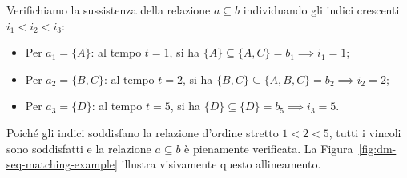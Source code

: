 Verifichiamo la sussistenza della relazione $a \subseteq b$ individuando gli indici crescenti $i_1 < i_2 < i_3$:
\begin{itemize}
    \item Per $a_1 = \{A\}$: al tempo $t = 1$, si ha $\{A\} \subseteq \{A, C\} = b_1 \implies i_1 = 1$;
    \item Per $a_2 = \{B, C\}$: al tempo $t = 2$, si ha $\{B, C\} \subseteq \{A, B, C\} = b_2 \implies i_2 = 2$;
    \item Per $a_3 = \{D\}$: al tempo $t = 5$, si ha $\{D\} \subseteq \{D\} = b_5 \implies i_3 = 5$.
\end{itemize}
Poiché gli indici soddisfano la relazione d'ordine stretto $1 < 2 < 5$, tutti i vincoli sono soddisfatti e la relazione $a \subseteq b$ è pienamente verificata. La Figura~\ref{fig:dm-seq-matching-example} illustra visivamente questo allineamento.

